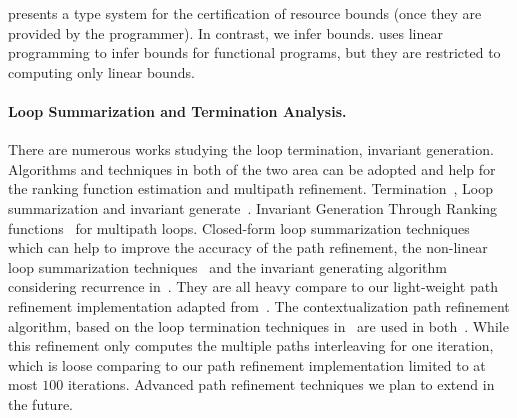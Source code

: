 \cite{CraryW00} presents a type system for the certification of resource bounds (once they are provided by the programmer). In contrast, we infer bounds. 
\cite{JostHLH10} uses linear programming to infer bounds for functional programs, but they are restricted to computing only linear bounds.

\paragraph{Loop Summarization and Termination Analysis.}
There are numerous works studying the loop termination, invariant generation. Algorithms and techniques in both of the two area can be adopted and help for the ranking function estimation and multipath refinement.
Termination~\cite{FalkeKS12, FalkeKS11},
Loop summarization and invariant generate~\cite{HumenbergerJK18}.
Invariant Generation Through Ranking functions~\cite{AliasDFG10} for multipath loops.
Closed-form loop summarization techniques~\cite{KincaidBCR19} which can help to improve the accuracy of the path refinement, the non-linear loop summarization techniques~\cite{KincaidCBR18} and the invariant generating algorithm considering recurrence in~\cite{BreckCKR20}. They are all heavy compare to our light-weight path refinement implementation adapted from~\cite{GulwaniJK09}.
The contextualization path refinement algorithm, based on the loop termination techniques in~\cite{ManoliosV06} are used in both~\cite{ZulegerGSV11, SinnZV14}. While this refinement only computes the multiple paths interleaving for one iteration, which is loose comparing to our path refinement implementation limited to at most $100$ iterations.
\cite{CyphertBKR19}
Advanced path refinement techniques we plan to extend in the future.
